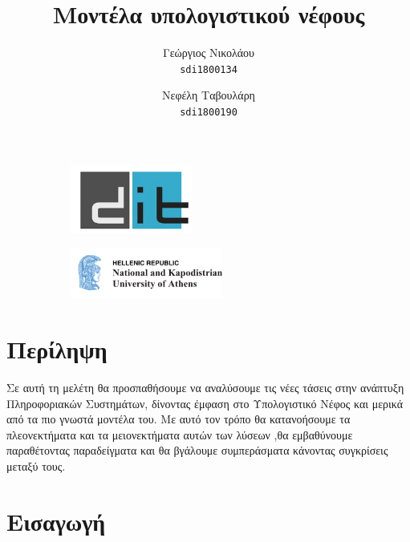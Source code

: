 \documentclass{article}
\title{%
  \selectlanguage{greek}\Huge
 Μοντέλα υπολογιστικού νέφους \\}
\begin{document}
\author{\LARGE
  Γεώργιος Νικολάου\\
   \texttt{\large sdi1800134}
  \and
  \LARGE
  Νεφέλη Ταβουλάρη\\
   \texttt{\large sdi1800190}
}
\maketitle


\begin{figure}
\centering
\begin{subfigure}
  \centering
  \includegraphics[width=40mm]{dit_logo}
  \label{fig:sub1}
\end{subfigure}%
\begin{subfigure}
  \centering
  \includegraphics[width=50mm]{NKUA_logo}
  \label{fig:sub2}
\end{subfigure}
\label{fig:test}
\end{figure}


\newpage
\tableofcontents
\newpage
\section{Περίληψη}
Σε αυτή τη μελέτη θα προσπαθήσουμε να αναλύσουμε τις νέες τάσεις στην ανάπτυξη Πληροφοριακών Συστημάτων, δίνοντας έμφαση στο Υπολογιστικό Νέφος και μερικά από τα πιο γνωστά μοντέλα του. Με αυτό τον τρόπο θα κατανοήσουμε τα πλεονεκτήματα και τα μειονεκτήματα αυτών των λύσεων ,θα εμβαθύνουμε παραθέτοντας παραδείγματα και θα βγάλουμε συμπεράσματα κάνοντας συγκρίσεις μεταξύ τους.
\section{Εισαγωγή}
\end{document}

